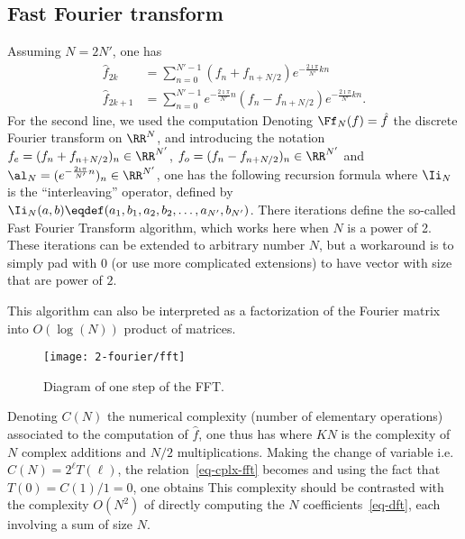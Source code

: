 \subsection{Fast Fourier transform}

Assuming $N=2N'$, one has 
\begin{align*}
	\hat f_{2k} &= \sum_{n=0}^{N'-1} (f_n + f_{n+N/2}) e^{ -\frac{2\imath\pi}{N'} k n } \\
	\hat f_{2k+1} &= \sum_{n=0}^{N'-1} e^{ -\frac{2\imath\pi}{N'} n } (f_n - f_{n+N/2}) e^{ -\frac{2\imath\pi}{N'} k n }.
\end{align*}
For the second line, we used the computation
Denoting $\Ff_N(f)=\hat f$ the discrete Fourier transform on $\RR^N$, and 
introducing the notation $f_e = (f_n + f_{n+N/2})_n \in \RR^{N'}$, $f_o = (f_n - f_{n+N/2})_n \in \RR^{N'}$
and $\al_N = (  e^{ -\frac{2\imath\pi}{N'} n } )_{n} \in \RR^{N'}$, one has the following recursion formula
where $\Ii_N$ is the ``interleaving'' operator, defined by $\Ii_N(a,b) \eqdef (a_1,b_1,a_2,b_2,\ldots,a_{N'},b_{N'})$.
%
There iterations define the so-called Fast Fourier Transform algorithm, which works here when $N$ is a power of 2. These iterations can be extended to arbitrary number $N$, but a workaround is to simply pad with 0 (or use more complicated extensions) to have vector with size that are power of $2$. 

This algorithm can also be interpreted as a factorization of the Fourier matrix into $O(\log(N))$ product of matrices. 

\begin{figure}
\centering
\texttt{[image: 2-fourier/fft]}
\caption{\label{fig-fft}
Diagram of one step of the FFT.
}
\end{figure}
 

Denoting $C(N)$ the numerical complexity (number of elementary operations) associated to the computation of $\hat f$, one thus has
where $K N$ is the complexity of $N$ complex additions and $N/2$ multiplications. Making the change of variable 
i.e. $C(N)=2^\ell T(\ell)$, the relation~\eqref{eq-cplx-fft} becomes
and using the fact that $T(0)=C(1)/1=0$, one obtains
This complexity should be contrasted with the complexity $O(N^2)$ of directly computing the $N$ coefficients~\eqref{eq-dft}, each involving a sum of size $N$. 


